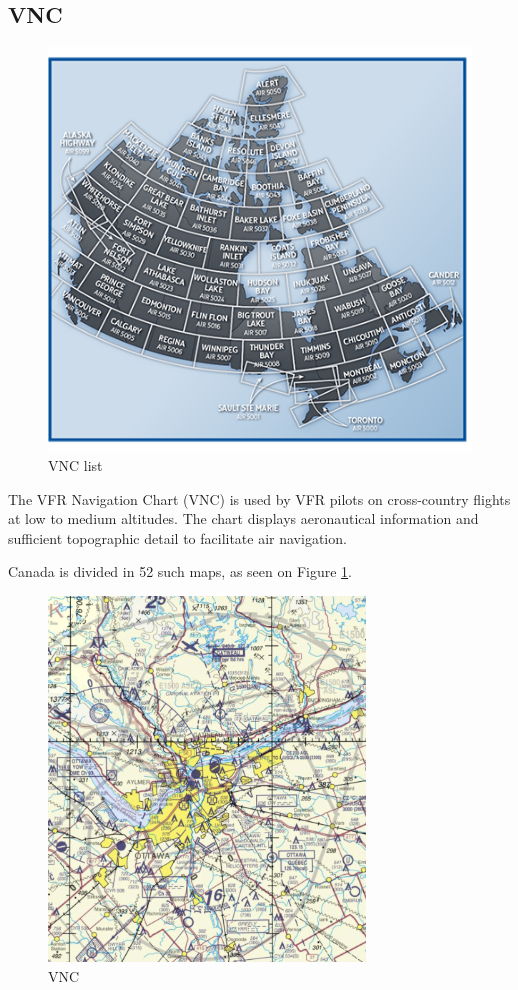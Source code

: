 \documentclass[12pt,letterpaper]{article}
\begin{document}
        \subsection{VNC}
        \begin{figure}
            \centering
            \includegraphics[scale=0.75]{vncs.png}
            \caption{VNC list}
            \label{fig:vnclist}
        \end{figure}

        The VFR Navigation Chart (VNC) is used by VFR pilots on cross-country flights at low to medium altitudes. The chart displays aeronautical information and sufficient topographic detail to facilitate air navigation. 

        Canada is divided in 52 such maps, as seen on Figure \ref{fig:vnclist}.
        
        \begin{figure}
            \centering
            \includegraphics[width=0.75\textwidth]{vnc.jpeg}
            \caption{VNC}
            \label{fig:vnc}
        \end{figure}
\end{document}
